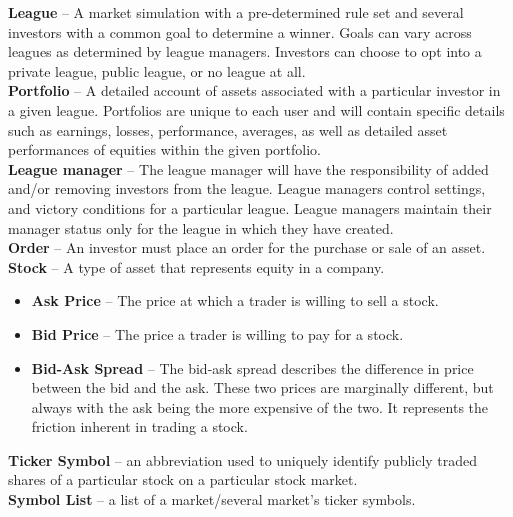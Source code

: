 \textbf{League} -- A market simulation with a pre-determined rule set
and several investors with a common goal to determine a winner. Goals
can vary across leagues as determined by league managers. Investors can
choose to opt into a private league, public league, or no league at all.\\

\textbf{Portfolio} -- A detailed account of assets associated with a
particular investor in a given league. Portfolios are unique to each user
and will contain specific details such as earnings, losses, performance,
averages, as well as detailed asset performances of equities within the
given portfolio.\\

\textbf{League manager} -- The league manager will have the responsibility
of added and/or removing investors from the league. League managers
control settings, and victory conditions for a particular league. League
managers maintain their manager status only for the league in which they
have created.\\

\textbf{Order} -- An investor must place an order for the purchase or
sale of an asset.\\

\textbf{Stock} -- A type of asset that represents equity in a company.
\begin{itemize}
    \item \textbf{Ask Price} -- The price at which a trader is willing
                                to sell a stock.
    \item \textbf{Bid Price} -- The price a trader is willing to pay for
                                a stock.
    \item \textbf{Bid-Ask Spread} -- The bid-ask spread describes the
                                     difference in price between the bid
                                     and the ask. These two prices are
                                     marginally different, but always with
                                     the ask being the more expensive of the
                                     two. It represents the friction inherent
                                     in trading a stock.
\end{itemize}

\textbf{Ticker Symbol} -- an abbreviation used to uniquely identify publicly
traded shares of a particular stock on a particular stock market.\\

\textbf{Symbol List} -- a list of a market/several market's ticker symbols.\\


